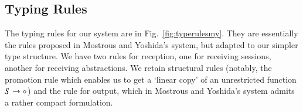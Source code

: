 \subsection{Typing Rules}

\newcommand{\jrule}[3]{\displaystyle \trule{#3}~~\frac{#1 }{#2}}
\newcommand{\addenv}{\circ}

The typing rules for our system are in Fig.~\ref{fig:typerulesmy}. 
They are essentially the rules proposed in Mostrous and Yoshida's system, but adapted to our simpler type structure.
We have two rules for reception, one for receiving sessions, another for receiving abstractions. 
We retain structural rules (notably, the promotion rule which enables us to get a `linear copy' of an unrestricted function $S \rightarrow \diamond$) and the rule for output, which in Mostrous and Yoshida's system admits a rather compact formulation.


